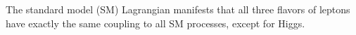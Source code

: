 The standard model (SM) Lagrangian manifests that all three flavors of leptons
have exactly the same coupling to all SM processes, except for Higgs.
